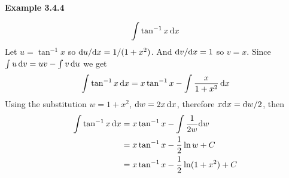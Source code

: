 \vspace{10mm}
\textbf{Example 3.4.4}

\begin{align*}
    \int \tan^{-1}x \, {\rm d}x
\end{align*}
Let $u = \tan^{-1}x$ so ${\rm d} u/{\rm d}x = 1/(1+x^2)$.
And ${\rm d} v/{\rm d}x = 1$ so $v = x$.
Since $\int u\, {\rm d}v = uv - \int v \, {\rm d} u$ we get
\begin{align*}
    \int \tan^{-1}x \, {\rm d}x &= x \tan^{-1}x - \int \frac{x}{1+x^2} \, {\rm d} x\\
\end{align*}
Using the substitution $w = 1+x^2$, ${\rm d}w = 2x \, {\rm d}x$, therefore $x {\rm d}x = {\rm d}w / 2$, then
\begin{align*}
    \int \tan^{-1}x \, {\rm d}x &= x \tan^{-1}x - \int \frac{1}{2w} {\rm d}w\\
    &= x \tan^{-1}x - \frac{1}{2}\ln w + C\\
    &= x \tan^{-1}x - \frac{1}{2}\ln(1+x^2) + C
\end{align*}
